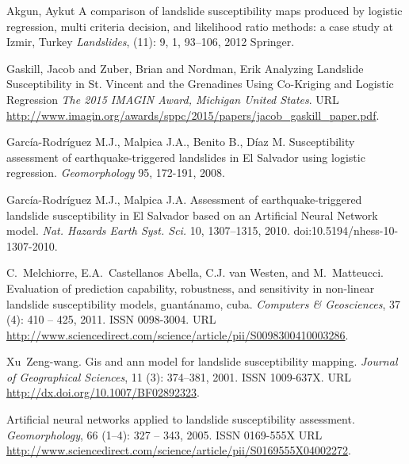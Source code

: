 \documentclass[11pt,twoside]{rmta2010esp}%
\begin{document}
\begin{thebibliography}{99}
  
  

Akgun, Aykut
\newblock A comparison of landslide susceptibility maps produced by logistic regression, multi criteria decision, and likelihood ratio methods: a case study at Izmir, Turkey
\newblock \emph{Landslides},
  (11): 9, 1, 93--106, 2012
\newblock Springer. 


Gaskill, Jacob and Zuber, Brian and Nordman, Erik
\newblock Analyzing Landslide Susceptibility in St. Vincent and the Grenadines Using Co-Kriging and Logistic Regression
\newblock \emph{The 2015 IMAGIN Award, Michigan United States}.
\newblock URL
  \url{http://www.imagin.org/awards/sppc/2015/papers/jacob_gaskill_paper.pdf}.
  
García-Rodríguez M.J., Malpica J.A., Benito B., Díaz M.
\newblock  Susceptibility assessment of earthquake-triggered landslides in El Salvador using logistic regression.
\newblock \emph{Geomorphology}
 95, 172-191, 2008. 
  


García-Rodríguez M.J., Malpica J.A.
\newblock Assessment of earthquake-triggered landslide susceptibility in El Salvador based on an Artificial Neural Network model.
\newblock \emph{Nat. Hazards Earth Syst. Sci.}
 10, 1307–1315, 2010. 
\newblock doi:10.5194/nhess-10-1307-2010.
  

C.~Melchiorre, E.A.~Castellanos Abella, C.J. van Westen, and M.~Matteucci.
\newblock Evaluation of prediction capability, robustness, and sensitivity in
  non-linear landslide susceptibility models, guantánamo, cuba.
\newblock \emph{Computers {\&} Geosciences}, 37 (4): 410 --
  425, 2011.
\newblock ISSN 0098-3004.
\newblock URL
  \url{http://www.sciencedirect.com/science/article/pii/S0098300410003286}.

Xu~Zeng-wang.
\newblock Gis and ann model for landslide susceptibility mapping.
\newblock \emph{Journal of Geographical Sciences}, 11 (3):
  374--381, 2001.
\newblock ISSN 1009-637X.
\newblock URL \url{http://dx.doi.org/10.1007/BF02892323}.


Artificial neural networks applied to landslide susceptibility assessment.
\newblock \emph{Geomorphology}, 66 (1–4): 327 -- 343, 2005.
\newblock ISSN 0169-555X
\newblock URL \url{http://www.sciencedirect.com/science/article/pii/S0169555X04002272}.




\end{thebibliography}
\end{document}

